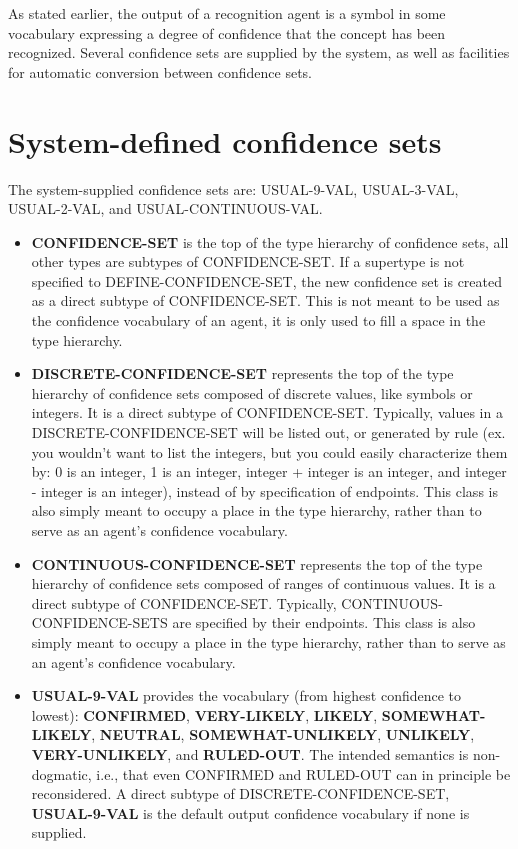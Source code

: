 As stated earlier, the output of a recognition agent is a symbol in
some vocabulary expressing a degree of confidence that the concept has
been recognized.  Several confidence sets are supplied by the system,
as well as facilities for automatic conversion between confidence
sets.

\section{System-defined confidence sets}

The system-supplied confidence sets are: USUAL-9-VAL, USUAL-3-VAL,
USUAL-2-VAL, and USUAL-CONTINUOUS-VAL.

\begin{itemize}

\item
{\bf CONFIDENCE-SET} is the top of the type hierarchy of confidence
sets, all other types are subtypes of CONFIDENCE-SET. If a supertype
is not specified to DEFINE-CONFIDENCE-SET, the new confidence set is
created as a direct subtype of CONFIDENCE-SET. This is not meant to be
used as the confidence vocabulary of an agent, it is only used to fill
a space in the type hierarchy.

\item
{\bf DISCRETE-CONFIDENCE-SET} represents the top of the type hierarchy
of confidence sets composed of discrete values, like symbols or
integers. It is a direct subtype of CONFIDENCE-SET.  Typically, values
in a DISCRETE-CONFIDENCE-SET will be listed out, or generated by rule
(ex. you wouldn't want to list the integers, but you could easily
characterize them by: 0 is an integer, 1 is an integer, integer +
integer is an integer, and integer - integer is an integer), instead
of by specification of endpoints. This class is also simply meant to
occupy a place in the type hierarchy, rather than to serve as an
agent's confidence vocabulary.

\item
{\bf CONTINUOUS-CONFIDENCE-SET} represents the top of the type
hierarchy of confidence sets composed of ranges of continuous values.
It is a direct subtype of CONFIDENCE-SET. Typically,
CONTINUOUS-CONFIDENCE-SETS are specified by their endpoints. This
class is also simply meant to occupy a place in the type hierarchy,
rather than to serve as an agent's confidence vocabulary.

\item
{\bf USUAL-9-VAL} provides the vocabulary (from highest confidence to
lowest): {\bf CONFIRMED}, {\bf VERY-LIKELY}, {\bf LIKELY}, {\bf
SOMEWHAT-LIKELY}, {\bf NEUTRAL}, {\bf SOMEWHAT-UNLIKELY}, {\bf
UNLIKELY}, {\bf VERY-UNLIKELY}, and {\bf RULED-OUT}. The intended
semantics is non-dogmatic, i.e., that even CONFIRMED and RULED-OUT can
in principle be reconsidered. A direct subtype of
DISCRETE-CONFIDENCE-SET, {\bf USUAL-9-VAL} is the default output
confidence vocabulary if none is supplied.


\end{itemize}
